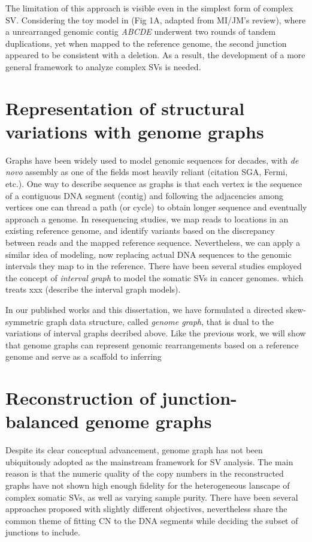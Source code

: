 \documentclass[phd,tocprelim]{cornell}
\begin{document}
The limitation of this approach is visible even in the simplest form of complex SV. Considering the toy model in (Fig 1A, adapted from MI/JM's review), where a unrearranged genomic contig \textit{ABCDE} underwent two rounds of tandem duplications, yet when mapped to the reference genome, the second junction appeared to be consistent with a deletion. As a result, the development of a more general framework to analyze complex SVs is needed.

\section{Representation of structural variations with genome graphs}
Graphs have been widely used to model genomic sequences for decades, with \textit{de novo} assembly as one of the fields most heavily reliant (citation SGA, Fermi, etc.). One way to describe sequence as graphs is that each vertex is the sequence of a contiguous DNA segment (contig) and following the adjacencies among vertices one can thread a path (or cycle) to obtain longer sequence and eventually approach a genome. In resequencing studies, we map reads to locations in an existing reference genome, and identify variants based on the discrepancy between reads and the mapped reference sequence. Nevertheless, we can apply a similar idea of modeling, now replacing actual DNA sequences to the genomic intervals they map to in the reference. There have been several studies employed the concept of \textit{interval graph} to model the somatic SVs in cancer genomes. which treats xxx (describe the interval graph models). %



In our published works and this dissertation, we have formulated a directed skew-symmetric graph data structure, called \textit{genome graph}, that is dual to the variations of interval graphs decribed above. Like the previous work, we will show that genome graphs can represent genomic rearrangements based on a reference genome and serve as a scaffold to inferring 

\section{Reconstruction of junction-balanced genome graphs}
Despite its clear conceptual advancement, genome graph has not been ubiquitously adopted as the mainstream framework for SV analysis. The main reason is that the numeric quality of the copy numbers in the reconstructed graphs have not shown high enough fidelity for the heterogeneous lanscape of complex somatic SVs, as well as varying sample purity. There have been several approaches proposed with slightly different objectives, nevertheless share the common theme of fitting CN to the DNA segments while deciding the subset of junctions to include.
\end{document}
